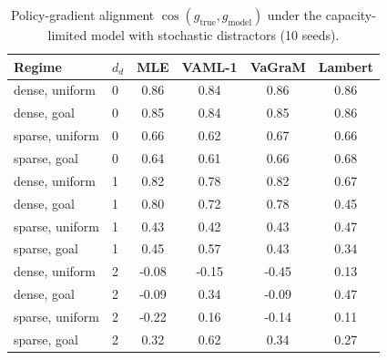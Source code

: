 \begin{table}[t]
\centering
\small
\caption{Policy-gradient alignment $\cos(g_{\text{true}}, g_{\mathrm{model}})$ under the capacity-limited model with stochastic distractors (10 seeds).}
\label{tab:exp1}
\begin{tabular}{llcccc}
\toprule
Regime & $d_d$ & MLE & VAML-1 & VaGraM & Lambert \\
\midrule
dense, uniform & 0 & 0.86 & 0.84 & 0.86 & 0.86 \\
dense, goal & 0 & 0.85 & 0.84 & 0.85 & 0.86 \\
sparse, uniform & 0 & 0.66 & 0.62 & 0.67 & 0.66 \\
sparse, goal & 0 & 0.64 & 0.61 & 0.66 & 0.68 \\
dense, uniform & 1 & 0.82 & 0.78 & 0.82 & 0.67 \\
dense, goal & 1 & 0.80 & 0.72 & 0.78 & 0.45 \\
sparse, uniform & 1 & 0.43 & 0.42 & 0.43 & 0.47 \\
sparse, goal & 1 & 0.45 & 0.57 & 0.43 & 0.34 \\
dense, uniform & 2 & -0.08 & -0.15 & -0.45 & 0.13 \\
dense, goal & 2 & -0.09 & 0.34 & -0.09 & 0.47 \\
sparse, uniform & 2 & -0.22 & 0.16 & -0.14 & 0.11 \\
sparse, goal & 2 & 0.32 & 0.62 & 0.34 & 0.27 \\
\bottomrule
\end{tabular}
\end{table}
